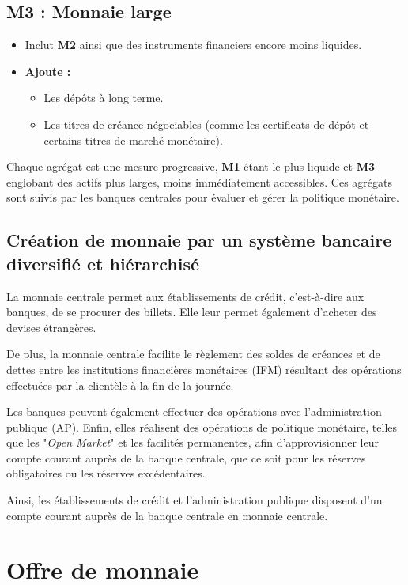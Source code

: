 \documentclass[a4paper, 12pt]{report}
\begin{document}
\subsection*{M3 : Monnaie large}
\begin{itemize}
	\item Inclut \textbf{M2} ainsi que des instruments financiers encore moins liquides.
	\item \textbf{Ajoute :}
	\begin{itemize}
		\item Les dépôts à long terme.
		\item Les titres de créance négociables (comme les certificats de dépôt et certains titres de marché monétaire).
	\end{itemize}
\end{itemize}

Chaque agrégat est une mesure progressive, \textbf{M1} étant le plus liquide et \textbf{M3} englobant des actifs plus larges, moins immédiatement accessibles. Ces agrégats sont suivis par les banques centrales pour évaluer et gérer la politique monétaire.
	
	
\subsection{Création de monnaie par un système bancaire diversifié et hiérarchisé}

La monnaie centrale permet aux établissements de crédit, c'est-à-dire aux banques, de se procurer des billets. Elle leur permet également d'acheter des devises étrangères. 

De plus, la monnaie centrale facilite le règlement des soldes de créances et de dettes entre les institutions financières monétaires (IFM) résultant des opérations effectuées par la clientèle à la fin de la journée. 

Les banques peuvent également effectuer des opérations avec l'administration publique (AP). Enfin, elles réalisent des opérations de politique monétaire, telles que les "\textit{Open Market}" et les facilités permanentes, afin d'approvisionner leur compte courant auprès de la banque centrale, que ce soit pour les réserves obligatoires ou les réserves excédentaires.

Ainsi, les établissements de crédit et l'administration publique disposent d'un compte courant auprès de la banque centrale en monnaie centrale.
	
\section{Offre de monnaie}
\end{document}
